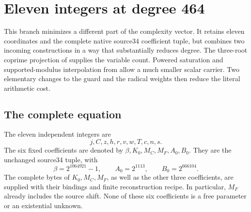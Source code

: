 \section{Eleven integers at degree 464}\label{sec:eleven}

This branch minimizes a different part of the complexity vector. It
retains eleven coordinates and the complete native source34 coefficient
tuple, but combines two incoming constructions in a way that substantially
reduces degree. The three-root coprime projection of \cite{coprime}
supplies the variable count. Powered saturation and supported-modulus
interpolation from \cite{round14} allow a much smaller scalar carrier.
Two elementary changes to the guard and the radical weights then reduce
the literal arithmetic cost.

\subsection{The complete equation}

The eleven independent integers are
\[
 j,C,z,h,r,v,w,T,c,n,s.
\]
The six fixed coefficients are denoted by
$\beta,K_0,M_C,M_F,A_0,B_0$. They are the unchanged source34 tuple,
with
\[
 \beta=2^{1064921}-1,\qquad A_0=2^{1113},\qquad B_0=2^{666104}.
\]
The complete bytes of $K_0,M_C,M_F$, as well as the other three
coefficients, are supplied with their bindings and finite reconstruction
recipe. In particular, $M_F$ already includes the source shift. None of
these six coefficients is a free parameter or an existential unknown.

